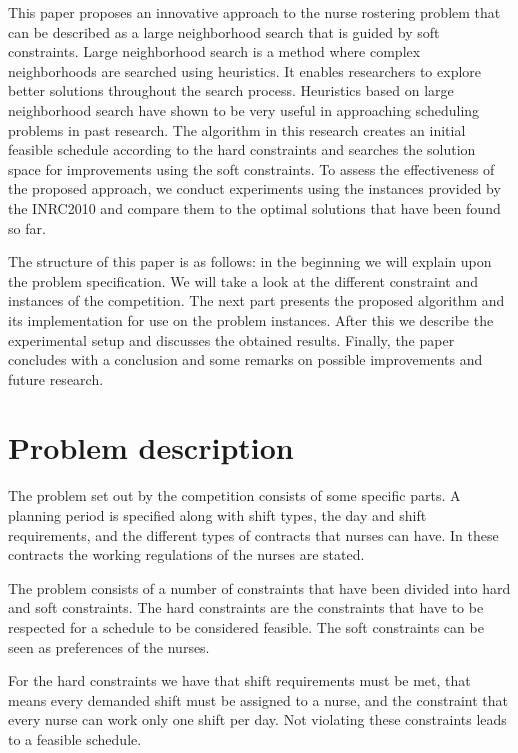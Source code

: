 \documentclass{article}
\begin{document}
This paper proposes an innovative approach to the nurse rostering problem that can be described as a large neighborhood search that is guided by soft constraints.
Large neighborhood search is a method where complex neighborhoods are searched using heuristics. It enables researchers to explore better solutions throughout the search process.
Heuristics based on large neighborhood search have shown to be very useful in approaching scheduling problems in past research\cite{Pisinger}. 
The algorithm in this research creates an initial feasible schedule according to the hard constraints and searches the solution space for improvements using the soft constraints.
To assess the effectiveness of the proposed approach, we conduct experiments using the instances provided by the INRC2010 and compare them to the optimal solutions that have been found so far. 

The structure of this paper is as follows: in the beginning we will explain upon the problem specification.
We will take a look at the different constraint and instances of the competition.
The next part presents the proposed algorithm and its implementation for use on the problem instances.
After this we describe the experimental setup and discusses the obtained results.
Finally, the paper concludes with a conclusion and some remarks on possible improvements and future research.

\section{Problem description}
The problem set out by the competition consists of some specific parts.
A planning period is specified along with shift types, the day and shift requirements, and the different types of contracts that nurses can have.
In these contracts the working regulations of the nurses are stated.

The problem consists of a number of constraints that have been divided into hard and soft constraints.
The hard constraints are the constraints that have to be respected for a schedule to be considered feasible.
The soft constraints can be seen as preferences of the nurses.

For the hard constraints we have that shift requirements must be met, that means every demanded shift must be assigned to a nurse, and the constraint that every nurse can work only one shift per day.
Not violating these constraints leads to a feasible schedule.
\end{document}
